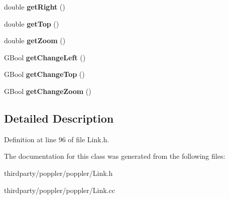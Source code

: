 \begin{DoxyCompactItemize}
double {\bfseries get\+Right} ()
\item 
\mbox{\label{class_link_dest_a24dd2ced4b6e9bb87888dc7f0f544639}} 
double {\bfseries get\+Top} ()
\item 
\mbox{\label{class_link_dest_a92c9621d86f5c8bb858116577ac20acb}} 
double {\bfseries get\+Zoom} ()
\item 
\mbox{\label{class_link_dest_ae80c134b562a99a5a05da81b5c6ec2e6}} 
G\+Bool {\bfseries get\+Change\+Left} ()
\item 
\mbox{\label{class_link_dest_a7bb59c057a60f2ee4103e461cd18a407}} 
G\+Bool {\bfseries get\+Change\+Top} ()
\item 
\mbox{\label{class_link_dest_a0611d43d3f041c913839d72f50b05f02}} 
G\+Bool {\bfseries get\+Change\+Zoom} ()
\end{DoxyCompactItemize}


\subsection{Detailed Description}


Definition at line 96 of file Link.\+h.



The documentation for this class was generated from the following files\+:\begin{DoxyCompactItemize}
\item 
thirdparty/poppler/poppler/Link.\+h\item 
thirdparty/poppler/poppler/Link.\+cc\end{DoxyCompactItemize}
